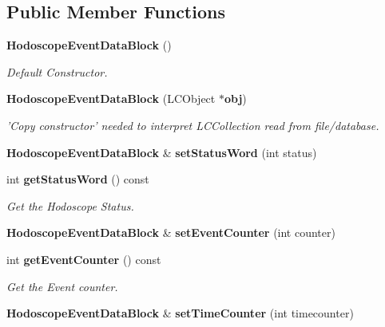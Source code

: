 \subsection*{Public Member Functions}
\begin{DoxyCompactItemize}
\item 
{\bf Hodoscope\-Event\-Data\-Block} ()\label{classCALICE_1_1HodoscopeEventDataBlock_a737bf8e239af349eee5ff61472f0d181}

\begin{DoxyCompactList}\small\item\em Default Constructor. \end{DoxyCompactList}\item 
{\bf Hodoscope\-Event\-Data\-Block} (L\-C\-Object $\ast${\bf obj})\label{classCALICE_1_1HodoscopeEventDataBlock_ab99ff6344343b01653080763d612294a}

\begin{DoxyCompactList}\small\item\em 'Copy constructor' needed to interpret L\-C\-Collection read from file/database. \end{DoxyCompactList}\item 
{\bf Hodoscope\-Event\-Data\-Block} \& {\bfseries set\-Status\-Word} (int status)\label{classCALICE_1_1HodoscopeEventDataBlock_a8c84a40787e11df246f568c9a71ceee3}

\item 
int {\bf get\-Status\-Word} () const \label{classCALICE_1_1HodoscopeEventDataBlock_af60190fb30f52df3a5697322a8965381}

\begin{DoxyCompactList}\small\item\em Get the Hodoscope Status. \end{DoxyCompactList}\item 
{\bf Hodoscope\-Event\-Data\-Block} \& {\bfseries set\-Event\-Counter} (int counter)\label{classCALICE_1_1HodoscopeEventDataBlock_aa900a9d896467976dd716c3bbab1f99f}

\item 
int {\bf get\-Event\-Counter} () const \label{classCALICE_1_1HodoscopeEventDataBlock_a76db2626be9c0cd318bcf1fd0fced760}

\begin{DoxyCompactList}\small\item\em Get the Event counter. \end{DoxyCompactList}\item 
{\bf Hodoscope\-Event\-Data\-Block} \& {\bf set\-Time\-Counter} (int timecounter)\label{classCALICE_1_1HodoscopeEventDataBlock_abb2c7d94d1148d184c54ae66e98c3be4}


\end{DoxyCompactItemize}
